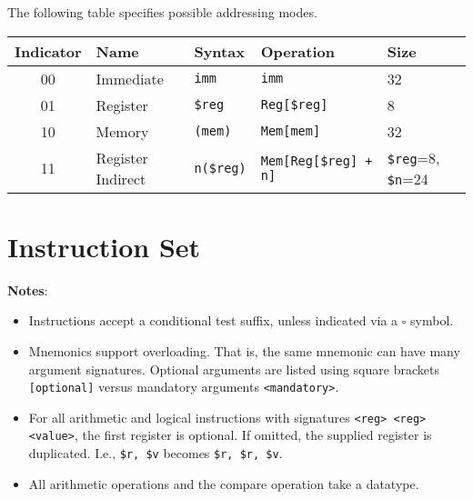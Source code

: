\documentclass[10pt]{article}
\begin{document}
The following table specifies possible addressing modes.

\medskip
\begin{tabular}{|c|l|l|l|l|}
    \hline
    \textbf{Indicator} & \textbf{Name} & \textbf{Syntax} & \textbf{Operation} & \textbf{Size} \\
    \hline
    00 & Immediate & \texttt{imm} & \texttt{imm} & 32 \\
    01 & Register & \texttt{\$reg} & \texttt{Reg[\$reg]} & 8 \\
    10 & Memory & \texttt{(mem)} & \texttt{Mem[mem]} & 32\\
    11 & Register Indirect & \texttt{n(\$reg)} & \texttt{Mem[Reg[\$reg] + n]} & \texttt{\$reg}=8, \texttt{\$n}=24 \\
    \hline
\end{tabular}

\section{Instruction Set}

\textbf{Notes}:

\begin{itemize}
    \item Instructions accept a conditional test suffix, unless indicated via a \(\square\) symbol.
    \item Mnemonics support overloading.
    That is, the same mnemonic can have many argument signatures.
    Optional arguments are listed using square brackets \texttt{[optional]} versus mandatory arguments \texttt{<mandatory>}.
    \item For all arithmetic and logical instructions with signatures \texttt{<reg> <reg> <value>}, the first register is optional.
    If omitted, the supplied register is duplicated.
    I.e., \texttt{\$r, \$v} becomes \texttt{\$r, \$r, \$v}.
    \item All arithmetic operations and the compare operation take a datatype.
\end{itemize}
\end{document}
